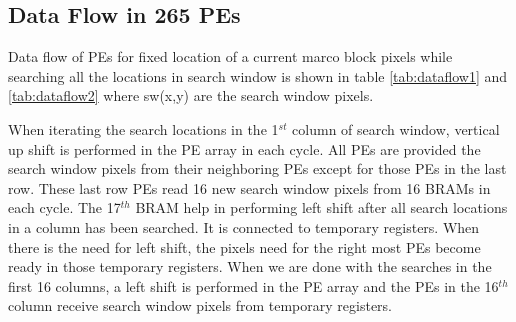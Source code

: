 \subsection{Data Flow in 265 PEs}

Data flow of PEs for fixed location of a current marco block pixels while searching all the locations in search window is shown in table \ref{tab:dataflow1} and \ref{tab:dataflow2} where sw(x,y) are the search window pixels.

When iterating the search locations in the 1$^{st}$ column of search window, vertical up shift is performed in the PE array in each cycle. All PEs are provided the search window pixels from their neighboring PEs except for those PEs in the last row. These last row PEs read 16 new search window pixels from 16 BRAMs in each cycle. The 17$^{th}$ BRAM help in performing left shift after all search locations in a column has been searched. It is connected to temporary registers. When there is the need for left shift, the pixels need for the right most PEs become ready in those temporary registers. When we are done with the searches in the first 16 columns, a left shift is performed in the PE array and the PEs in the 16$^{th}$ column receive search window pixels from temporary registers. 


